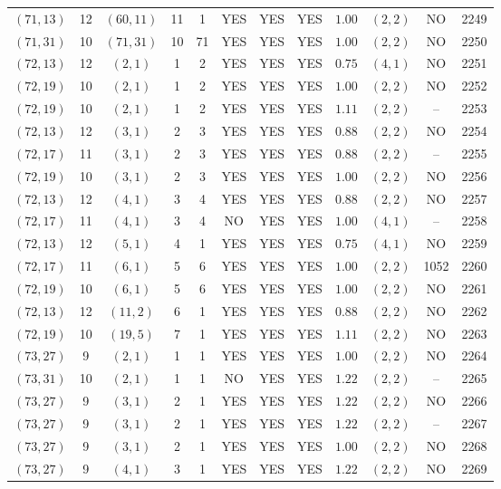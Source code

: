 \begin{longtable}{|c|c|c|c|c|c|c|c|c|c|c|c|}
$(71,13)$ & 12 & $(60,11)$ & 11 & 1 & YES & YES & YES & $1.00$ & $(2,2)$ & NO & 2249\\
$(71,31)$ & 10 & $(71,31)$ & 10 & 71 & YES & YES & YES & $1.00$ & $(2,2)$ & NO & 2250\\
$(72,13)$ & 12 & $(2,1)$ & 1 & 2 & YES & YES & YES & $0.75$ & $(4,1)$ & NO & 2251\\
$(72,19)$ & 10 & $(2,1)$ & 1 & 2 & YES & YES & YES & $1.00$ & $(2,2)$ & NO & 2252\\
$(72,19)$ & 10 & $(2,1)$ & 1 & 2 & YES & YES & YES & $1.11$ & $(2,2)$ & -- & 2253\\
$(72,13)$ & 12 & $(3,1)$ & 2 & 3 & YES & YES & YES & $0.88$ & $(2,2)$ & NO & 2254\\
$(72,17)$ & 11 & $(3,1)$ & 2 & 3 & YES & YES & YES & $0.88$ & $(2,2)$ & -- & 2255\\
$(72,19)$ & 10 & $(3,1)$ & 2 & 3 & YES & YES & YES & $1.00$ & $(2,2)$ & NO & 2256\\
$(72,13)$ & 12 & $(4,1)$ & 3 & 4 & YES & YES & YES & $0.88$ & $(2,2)$ & NO & 2257\\
$(72,17)$ & 11 & $(4,1)$ & 3 & 4 & NO & YES & YES & $1.00$ & $(4,1)$ & -- & 2258\\
$(72,13)$ & 12 & $(5,1)$ & 4 & 1 & YES & YES & YES & $0.75$ & $(4,1)$ & NO & 2259\\
$(72,17)$ & 11 & $(6,1)$ & 5 & 6 & YES & YES & YES & $1.00$ & $(2,2)$ & 1052 & 2260\\
$(72,19)$ & 10 & $(6,1)$ & 5 & 6 & YES & YES & YES & $1.00$ & $(2,2)$ & NO & 2261\\
$(72,13)$ & 12 & $(11,2)$ & 6 & 1 & YES & YES & YES & $0.88$ & $(2,2)$ & NO & 2262\\
$(72,19)$ & 10 & $(19,5)$ & 7 & 1 & YES & YES & YES & $1.11$ & $(2,2)$ & NO & 2263\\
$(73,27)$ & 9 & $(2,1)$ & 1 & 1 & YES & YES & YES & $1.00$ & $(2,2)$ & NO & 2264\\
$(73,31)$ & 10 & $(2,1)$ & 1 & 1 & NO & YES & YES & $1.22$ & $(2,2)$ & -- & 2265\\
$(73,27)$ & 9 & $(3,1)$ & 2 & 1 & YES & YES & YES & $1.22$ & $(2,2)$ & NO & 2266\\
$(73,27)$ & 9 & $(3,1)$ & 2 & 1 & YES & YES & YES & $1.22$ & $(2,2)$ & -- & 2267\\
$(73,27)$ & 9 & $(3,1)$ & 2 & 1 & YES & YES & YES & $1.00$ & $(2,2)$ & NO & 2268\\
$(73,27)$ & 9 & $(4,1)$ & 3 & 1 & YES & YES & YES & $1.22$ & $(2,2)$ & NO & 2269\\

\end{longtable}

